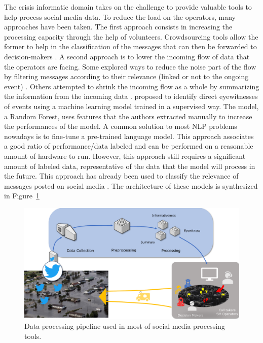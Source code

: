 The crisis informatic domain takes on the challenge to provide valuable tools to help process social media data.
To reduce the load on the operators, many approaches have been taken.
The first approach consists in increasing the processing capacity through the help of volunteers.
Crowdsourcing tools allow the former to help in the classification of the messages that can then be forwarded to decision-makers \parencite{imranAIDRArtificialIntelligence2014}.
A second approach is to lower the incoming flow of data that the operators are facing.
Some explored ways to reduce the noise part of the flow by filtering messages according to their relevance (linked or not to the ongoing event) \parencite{carageaClassifyingTextMessages2011,imranAIDRArtificialIntelligence2014}.
Others attempted to shrink the incoming flow as a whole by summarizing the information from the incoming data \parencite{rudraSummarizingSituationalTweets2016}.
\textcite{zahraAutomaticIdentificationEyewitness2020} proposed to identify direct eyewitnesses of events using a machine learning model trained in a supervised way.
The model, a Random Forest, uses features that the authors extracted manually to increase the performances of the model.
A common solution to most NLP problems nowadays is to fine-tune a pre-trained language model.
This approach associates a good ratio of performance/data labeled and can be performed on a reasonable amount of hardware to run.
However, this approach still requires a significant amount of labeled data, representative of the data that the model will process in the future.
This approach has already been used to classify the relevance of messages posted on social media \parencite{kozlowskiThreelevelClassificationFrench2020}.
The architecture of these models is synthesized in Figure~\ref{processing:social-media-processing}

\begin{figure}[htb]
    \centering
    \includegraphics[width=\textwidth]{figures/chap-4/social-media-processing.pdf}
    \caption{Data processing pipeline used in most of social media processing tools.}
    \label{processing:social-media-processing}
\end{figure}

